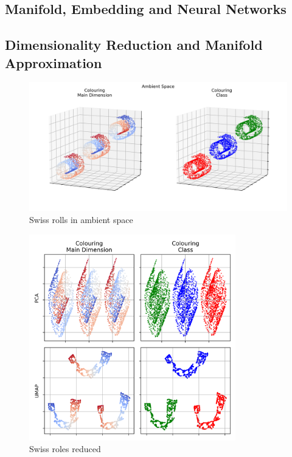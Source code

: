 \subsection{Manifold, Embedding and Neural Networks}
\lorem


\subsection{Dimensionality Reduction and Manifold Approximation}
\label{dim_reduction}
\begin{figure}[h]
  \centering
  \includegraphics[width=\textwidth]{images/chapter_4/ambient.png}
    \caption[\textbf{Swiss rolls in ambient space}]{Swiss rolls in ambient space}
    \label{fig: swiss_ambient}
\end{figure}

\label{dim_reduction}
\begin{figure}[h]
  \centering
  \includegraphics[width=0.8\textwidth]{images/chapter_4/reduced.png}
    \caption[\textbf{PCA and UMAP reduction of Swiss rolls}]{Swiss roles reduced}
    \label{fig: swiss_reduce}
\end{figure}
\lorem

